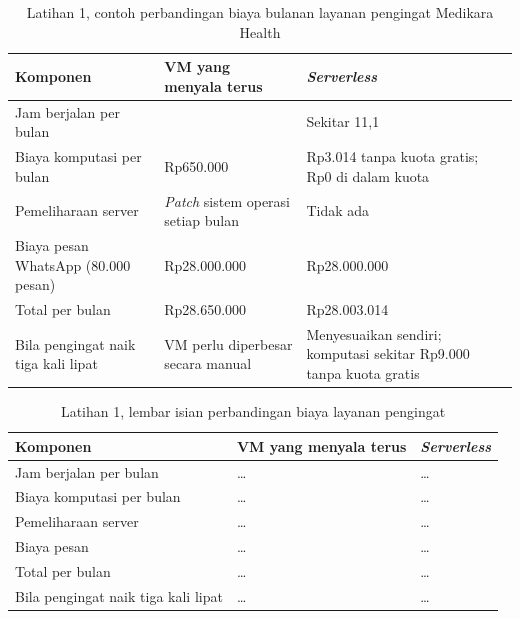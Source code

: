 \begin{table}[!htb]
  \centering
  \caption{Latihan 1, contoh perbandingan biaya bulanan layanan pengingat Medikara Health}
  \label{tab:ch08-lat1-contoh}
  \footnotesize
  \begin{tabularx}{\textwidth}{>{\raggedright\arraybackslash}X >{\raggedright\arraybackslash}p{3.3cm}
      >{\raggedright\arraybackslash}p{3.3cm}}
    \hline
    \textbf{Komponen} & \textbf{VM yang menyala terus} & \textbf{\textit{Serverless}} \\ \hline
    Jam berjalan per bulan & 720 & Sekitar 11,1 \\ \hline
    Biaya komputasi per bulan & Rp650.000 & Rp3.014 tanpa kuota gratis; Rp0 di dalam kuota \\ \hline
    Pemeliharaan server & \textit{Patch} sistem operasi setiap bulan & Tidak ada \\ \hline
    Biaya pesan WhatsApp (80.000 pesan) & Rp28.000.000 & Rp28.000.000 \\ \hline
    Total per bulan & Rp28.650.000 & Rp28.003.014 \\ \hline
    Bila pengingat naik tiga kali lipat & VM perlu diperbesar secara manual & Menyesuaikan sendiri;
      komputasi sekitar Rp9.000 tanpa kuota gratis \\ \hline
  \end{tabularx}
\end{table}

\begin{table}[!htb]
  \centering
  \caption{Latihan 1, lembar isian perbandingan biaya layanan pengingat}
  \label{tab:ch08-lat1-hasil}
  \footnotesize
  \begin{tabularx}{\textwidth}{>{\raggedright\arraybackslash}X >{\raggedright\arraybackslash}p{3.3cm}
      >{\raggedright\arraybackslash}p{3.3cm}}
    \hline
    \textbf{Komponen} & \textbf{VM yang menyala terus} & \textbf{\textit{Serverless}} \\ \hline
    Jam berjalan per bulan & \dots & \dots \\ \hline
    Biaya komputasi per bulan & \dots & \dots \\ \hline
    Pemeliharaan server & \dots & \dots \\ \hline
    Biaya pesan & \dots & \dots \\ \hline
    Total per bulan & \dots & \dots \\ \hline
    Bila pengingat naik tiga kali lipat & \dots & \dots \\ \hline
  \end{tabularx}
\end{table}

